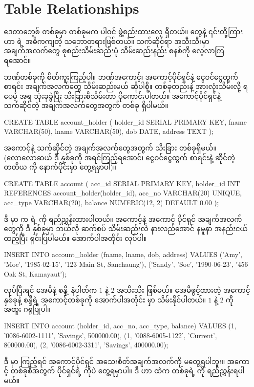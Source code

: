 \section{Table Relationships}
ဒေတာဘေ့စ် တစ်ခုမှာ  တစ်ခုမက  ပါဝင် ဖွဲ့စည်းထားလေ့ ရှိတယ်။  တွေနဲ့ ၎င်းတို့ကြား  ဟာ  ရဲ့ အဓိကကျတဲ့ သဘောတရားဖြစ်တယ်။ သက်ဆိုင်\allowbreak ရာ  အသီးသီးမှာ အချက်အလက်တွေ စုစည်းသိမ်းဆည်းပုံ သိမ်းဆည်းနည်း စနစ်ကို လေ့လာကြရအောင်။ 

ဘဏ်တစ်ခုကို စိတ်ကူးကြည့်ပါ။ ဘဏ်အကောင့်၊ အကောင့်ပိုင်ရှင်နဲ့ ငွေဝင်ငွေထွက် စာရင်း အချက်\allowbreak အလက်တွေ သိမ်းဆည်းမယ် ဆိုပါစို့။  တစ်ခုတည်းနဲ့ အားလုံးသိမ်းလို့ ရပေမဲ့  အရ  သုံးခုခွဲပြီး သီးခြားစီသိမ်းတာ ပိုကောင်းပါတယ်။  အကောင့်ပိုင်ရှင်နဲ့ သက်ဆိုင်တဲ့ အချက်အလက်တွေအတွက်  တစ်ခု ရှိပါမယ်။
%
\begin{sql}
CREATE TABLE account_holder (
    holder_id SERIAL PRIMARY KEY,
    fname VARCHAR(50),
    lname VARCHAR(50),
    dob DATE,
    address TEXT
);
\end{sql}
%
အကောင့်နဲ့ သက်ဆိုင်တဲ့ အချက်အလက်တွေအတွက် သီးခြား  တစ်ခုရှိမယ်။ (လောလောဆယ် ဒီ  နှစ်ခုကို အရင်ကြည့်ရအောင်၊ ငွေဝင်ငွေထွက် စာရင်းနဲ့ ဆိုင်တဲ့ တတိယ  ကို နောက်ပိုင်းမှာ တွေ့ရမှာပါ)။ 
%
\begin{sql}
CREATE TABLE account (
    acc_id SERIAL PRIMARY KEY,
    holder_id INT REFERENCES account_holder(holder_id),
    acc_no VARCHAR(20) UNIQUE,
    acc_type VARCHAR(20),
    balance NUMERIC(12, 2) DEFAULT 0.00
);
\end{sql}
%
ဒီ   မှာ   က   ရဲ့   ကို ရည်ညွှန်းထားပါတယ်။ အကောင့်နဲ့ အကောင့် ပိုင်ရှင် အချက်အလက်တွေကို ဒီ  နှစ်ခုမှာ ဘယ်လို ဆက်စပ် သိမ်းဆည်းလဲ နားလည်အောင် နမူနာ  အနည်းငယ်ထည့်ပြီး ရှင်းပြပါမယ်။ အောက်ပါအတိုင်း  လုပ်ပါ။
%
\begin{sql}
INSERT INTO account_holder (fname, lname, dob, address)
VALUES 
('Amy', 'Moe', '1985-02-15', '123 Main St, Sanchaung'),
('Sandy', 'Soe', '1990-06-23', '456 Oak St, Kamayaut');
\end{sql}
%
 လုပ်ပြီးရင် အေမီနဲ့ စန္ဒီ့  နံပါတ်က $1$ နဲ့ $2$ အသီးသီး ဖြစ်မယ်။ အေမီဖွင့်ထားတဲ့ အကောင့်နှစ်ခုနဲ့ စန္ဒီရဲ့ အကောင့်တစ်ခုကို အောက်ပါအတိုင်း   မှာ သိမ်းနိုင်ပါတယ်။  $1$ နဲ့ $2$ ကို အထူး ဂရုပြုပါ။
%
\begin{sql}
INSERT INTO account (holder_id, acc_no, acc_type, balance)
VALUES 
(1, '0086-6002-1111', 'Savings', 500000.00),
(1, '0088-6005-1122', 'Current', 800000.00),
(2, '0086-6002-3311', 'Savings', 400000.00);
\end{sql}
%
ဒီ  မှာ ကြည့်ရင် အကောင့်ပိုင်ရှင် အသေးစိတ်အချက်အလက်ကို မတွေ့ရပါဘူး။ အကောင့်  တစ်ခုစီအတွက်  ပိုင်ရှင်ရဲ့  ကိုပဲ တွေ့ရမှာပါ။ ဒီ  ဟာ   ထဲက  တစ်ခုရဲ့  ကို ရည်ညွှန်းရပါမယ်။ 

